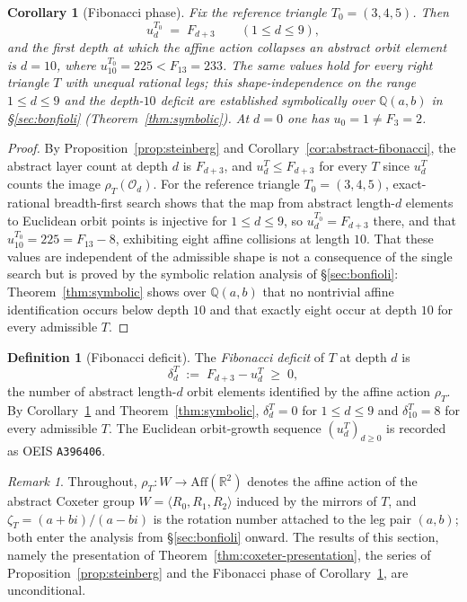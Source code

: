 \documentclass[11pt]{article}
\theoremstyle{plain}
\newtheorem{corollary}[theorem]{Corollary}
\theoremstyle{definition}
\newtheorem{definition}[theorem]{Definition}
\theoremstyle{remark}
\newtheorem{remark}[theorem]{Remark}
\begin{document}
\begin{corollary}[Fibonacci phase]
\label{cor:fibonacci-phase}
Fix the reference triangle $T_0 = (3,4,5)$. Then
\[
  u_d^{T_0} \;=\; F_{d+3}
  \qquad (1 \le d \le 9),
\]
and the first depth at which the affine action collapses an abstract orbit element is $d = 10$, where $u_{10}^{T_0} = 225 < F_{13} = 233$. The same values hold for every right triangle $T$ with unequal rational legs; this shape-independence on the range $1 \le d \le 9$ and the depth-$10$ deficit are established symbolically over $\mathbb{Q}(a,b)$ in \S\ref{sec:bonfioli} (Theorem~\ref{thm:symbolic}). At $d = 0$ one has $u_0 = 1 \neq F_3 = 2$.
\end{corollary}

\begin{proof}
By Proposition~\ref{prop:steinberg} and Corollary~\ref{cor:abstract-fibonacci}, the abstract layer count at depth $d$ is $F_{d+3}$, and $u_d^T \le F_{d+3}$ for every $T$ since $u_d^T$ counts the image $\rho_T(\mathcal{O}_d)$. For the reference triangle $T_0 = (3,4,5)$, exact-rational breadth-first search shows that the map from abstract length-$d$ elements to Euclidean orbit points is injective for $1 \le d \le 9$, so $u_d^{T_0} = F_{d+3}$ there, and that $u_{10}^{T_0} = 225 = F_{13} - 8$, exhibiting eight affine collisions at length $10$. That these values are independent of the admissible shape is not a consequence of the single search but is proved by the symbolic relation analysis of \S\ref{sec:bonfioli}: Theorem~\ref{thm:symbolic} shows over $\mathbb{Q}(a,b)$ that no nontrivial affine identification occurs below depth $10$ and that exactly eight occur at depth $10$ for every admissible $T$.
\end{proof}

\begin{definition}[Fibonacci deficit]
\label{def:deficit}
The \emph{Fibonacci deficit} of $T$ at depth $d$ is
\[
  \delta_d^T \;:=\; F_{d+3} - u_d^T \;\ge\; 0 ,
\]
the number of abstract length-$d$ orbit elements identified by the affine action $\rho_T$. By Corollary~\ref{cor:fibonacci-phase} and Theorem~\ref{thm:symbolic}, $\delta_d^T = 0$ for $1 \le d \le 9$ and $\delta_{10}^T = 8$ for every admissible $T$. The Euclidean orbit-growth sequence $(u_d^T)_{d \ge 0}$ is recorded as OEIS \texttt{A396406}.
\end{definition}

\begin{remark}
\label{rem:setting-notation}
Throughout, $\rho_T \colon W \to \mathrm{Aff}(\mathbb{R}^2)$ denotes the affine action of the abstract Coxeter group $W = \langle R_0, R_1, R_2 \rangle$ induced by the mirrors of $T$, and $\zeta_T = (a + bi)/(a - bi)$ is the rotation number attached to the leg pair $(a,b)$; both enter the analysis from \S\ref{sec:bonfioli} onward. The results of this section, namely the presentation of Theorem~\ref{thm:coxeter-presentation}, the series of Proposition~\ref{prop:steinberg} and the Fibonacci phase of Corollary~\ref{cor:fibonacci-phase}, are unconditional.
\end{remark}
\end{document}
